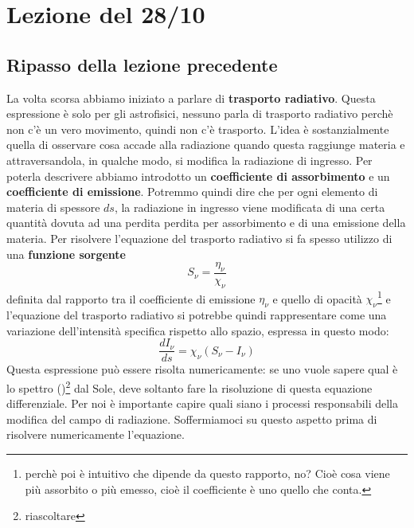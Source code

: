 \documentclass[a4paper,11pt]{article}
\begin{document}
    
    
    
    \newpage
\section{Lezione del 28/10}
\subsection{Ripasso della lezione precedente}
La volta scorsa abbiamo iniziato a parlare di \textbf{trasporto radiativo}. Questa espressione è solo per gli astrofisici, nessuno parla di trasporto radiativo perchè non c'è un vero movimento, quindi non c'è trasporto. L'idea è sostanzialmente quella di osservare cosa accade alla radiazione quando questa raggiunge materia e attraversandola, in qualche modo, si modifica la radiazione di ingresso. Per poterla descrivere abbiamo introdotto un \textbf{coefficiente di assorbimento} e un \textbf{coefficiente di emissione}. Potremmo quindi dire che per ogni elemento di materia di spessore $ds$, la radiazione in ingresso viene modificata di una certa quantità dovuta ad una perdita perdita per assorbimento e di una emissione della materia.
\newline 
Per risolvere l'equazione del trasporto radiativo si fa spesso utilizzo di una \textbf{funzione sorgente}
$$
    S_\nu=\frac{\eta_{\nu}}{\chi_{\nu}}
$$
definita dal rapporto tra il coefficiente di emissione $\eta_{\nu}$ e quello di opacità $\chi_{\nu}$\footnote{perchè poi è intuitivo che dipende da questo rapporto, no? Cioè cosa viene più assorbito o più emesso, cioè il coefficiente è uno quello che conta.} e l'equazione del trasporto radiativo si potrebbe quindi rappresentare come una variazione dell'intensità specifica rispetto allo spazio, espressa in questo modo:
$$
\frac{dI_{\nu}}{ds}=\chi_{\nu}(S_{\nu}-I_{\nu})
$$
Questa espressione può essere risolta numericamente: se uno vuole sapere qual è lo spettro ()\footnote{riascoltare} dal Sole, deve soltanto fare la risoluzione di questa equazione differenziale.
\newline
Per noi è importante capire quali siano i processi responsabili della modifica del campo di radiazione. Soffermiamoci su questo aspetto prima di risolvere numericamente l'equazione.
\end{document}
